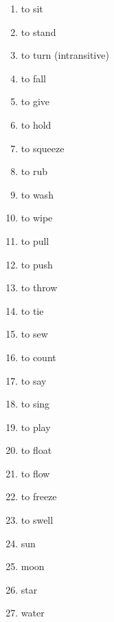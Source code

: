 \begin{multicols}{2}
\begin{enumerate}
\item   to sit 

\item   to stand 

\item   to turn (intransitive) 

\item   to fall 

\item   to give 

\item   to hold 

\item   to squeeze 

\item   to rub 

\item   to wash 

\item   to wipe 

\item   to pull 

\item   to push 

\item   to throw 

\item   to tie 

\item   to sew 

\item   to count 

\item   to say 

\item   to sing 

\item   to play 

\item   to float 

\item   to flow 

\item   to freeze 

\item   to swell 

\item   sun 

\item   moon 

\item   star 

\item   water 


\end{enumerate}
\end{multicols}
